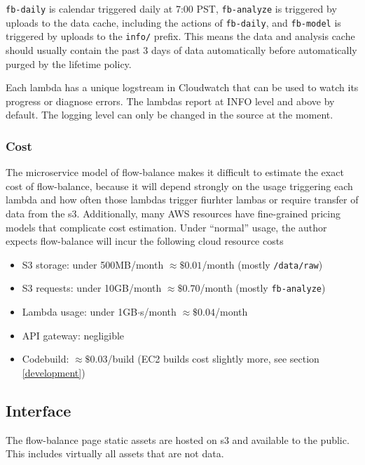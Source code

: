 \documentclass[titlepage]{article}
\begin{document}
\texttt{fb-daily} is calendar triggered daily at 7:00 PST, \texttt{fb-analyze} is triggered by uploads to the data cache, including the actions of \texttt{fb-daily}, and \texttt{fb-model} is triggered by uploads to the \texttt{info/} prefix. This means the data and analysis cache should usually contain the past 3 days of data automatically before automatically purged by the lifetime policy.

Each lambda has a unique logstream in Cloudwatch that can be used to watch its progress or diagnose errors. The lambdas report at INFO level and above by default. The logging level can only be changed in the source at the moment.

\subsubsection{Cost}\label{cost}
The microservice model of flow-balance makes it difficult to estimate the exact cost of flow-balance, because it will depend strongly on the usage triggering each lambda and how often those lambdas trigger fiurhter lambas or require transfer of data from the s3. Additionally, many AWS resources have fine-grained pricing models that complicate cost estimation. Under ``normal'' usage, the author expects flow-balance will incur the following cloud resource costs
\begin{itemize}
	\item S3 storage: under 500MB/month $\approx \$0.01$/month (mostly \texttt{/data/raw})
	\item S3 requests: under 10GB/month $\approx \$0.70$/month (mostly \texttt{fb-analyze})
	\item Lambda usage: under 1GB$\cdot$s/month $\approx \$0.04$/month
	\item API gateway: negligible
	\item Codebuild: $\approx \$0.03$/build (EC2 builds cost slightly more, see section \ref{development})
\end{itemize}


\subsection{Interface}\label{frontend}
The flow-balance page static assets are hosted on s3 and available to the public. This includes virtually all assets that are not data.
\end{document}
